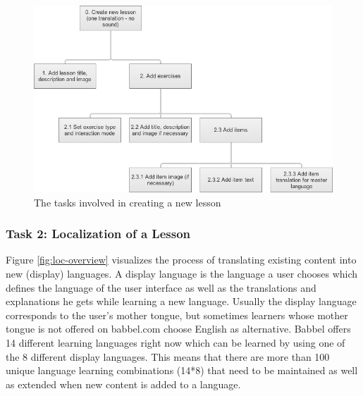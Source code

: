 \begin{figure}[h]
 \centering
 \includegraphics[width=12cm]{images/task-analysis/create_lesson}
 \caption{The tasks involved in creating a new lesson}
 \label{fig:build}
\end{figure}



\subsubsection{Task 2: Localization of a Lesson} \label{sec:task-localization}
Figure \ref{fig:loc-overview} visualizes the process of translating existing content into new (display) languages. A display language is the language a user chooses which defines the language of the user interface as well as the translations and explanations he gets while learning a new language. Usually the display language corresponds to the user’s mother tongue, but sometimes learners whose mother tongue is not offered on babbel.com choose English as alternative. Babbel offers 14 different learning languages right now which can be learned by using one of the 8 different display languages. This means that there are more than 100 unique language learning combinations (14*8) that need to be maintained as well as extended when new content is added to a language.

